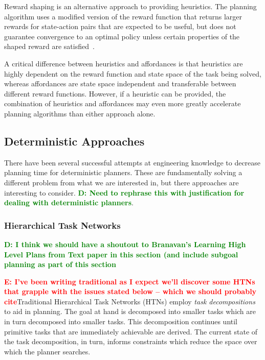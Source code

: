 \documentclass[conference]{IEEEtran}
\newcommand{\dnote}[1]{\textcolor{Green}{\textbf{D: #1}}}
\newcommand{\enote}[1]{\textcolor{Red}{\textbf{E: #1}}}
\begin{document}
Reward shaping is an alternative approach to providing heuristics. The planning algorithm uses a modified version of the reward function that returns larger rewards for state-action pairs that are expected to be useful, but does not guarantee convergence to an optimal policy unless certain properties of the shaped reward are satisfied~\cite{potshap}.

A critical difference between heuristics and affordances is that heuristics are highly dependent on the reward function and state space of the task being solved, whereas affordances are state space independent and transferable between different reward functions. However, if a heuristic can be provided, the combination of heuristics and affordances may even more greatly accelerate planning algorithms than either approach alone.

\subsection{Deterministic Approaches}

There have been several successful attempts at engineering knowledge to
decrease planning time for deterministic planners. These are fundamentally solving
a different problem from what we are interested in, but there approaches are interesting to consider.
\dnote{Need to rephrase this with justification for dealing with deterministic planners}.

\subsubsection{Hierarchical Task Networks}

\dnote{I think we should have a shoutout to Branavan's Learning High Level Plans from Text paper in this section (and include subgoal planning as part of this section}

\enote{I've been writing traditional as I expect we'll discover some HTNs that grapple with the issues stated below -- which we should probably cite}Traditional Hierarchical Task Networks (HTNs) employ \textit{task decompositions} to aid in planning. The goal at hand is decomposed into smaller tasks which are in turn decomposed into smaller tasks. This decomposition continues until primitive tasks that are immediately achievable are derived. The current state of the task decomposition, in turn, informs constraints which reduce the space over which the planner searches.
\end{document}
